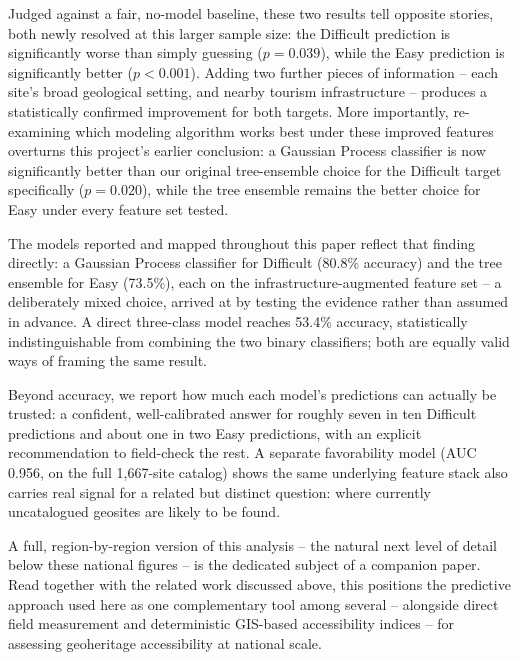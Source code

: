 \documentclass[11pt,a4paper]{article}
\begin{document}
Judged against a fair, no-model baseline, these two results tell opposite stories, both newly resolved at this larger sample size: the Difficult prediction is significantly worse than simply guessing ($p=0.039$), while the Easy prediction is significantly better ($p<0.001$). Adding two further pieces of information -- each site's broad geological setting, and nearby tourism infrastructure -- produces a statistically confirmed improvement for both targets. More importantly, re-examining which modeling algorithm works best under these improved features overturns this project's earlier conclusion: a Gaussian Process classifier is now significantly better than our original tree-ensemble choice for the Difficult target specifically ($p=0.020$), while the tree ensemble remains the better choice for Easy under every feature set tested.

The models reported and mapped throughout this paper reflect that finding directly: a Gaussian Process classifier for Difficult (80.8\% accuracy) and the tree ensemble for Easy (73.5\%), each on the infrastructure-augmented feature set -- a deliberately mixed choice, arrived at by testing the evidence rather than assumed in advance. A direct three-class model reaches 53.4\% accuracy, statistically indistinguishable from combining the two binary classifiers; both are equally valid ways of framing the same result.

Beyond accuracy, we report how much each model's predictions can actually be trusted: a confident, well-calibrated answer for roughly seven in ten Difficult predictions and about one in two Easy predictions, with an explicit recommendation to field-check the rest. A separate favorability model (AUC 0.956, on the full 1,667-site catalog) shows the same underlying feature stack also carries real signal for a related but distinct question: where currently uncatalogued geosites are likely to be found.

A full, region-by-region version of this analysis -- the natural next level of detail below these national figures -- is the dedicated subject of a companion paper. Read together with the related work discussed above, this positions the predictive approach used here as one complementary tool among several -- alongside direct field measurement and deterministic GIS-based accessibility indices -- for assessing geoheritage accessibility at national scale.
\end{document}
